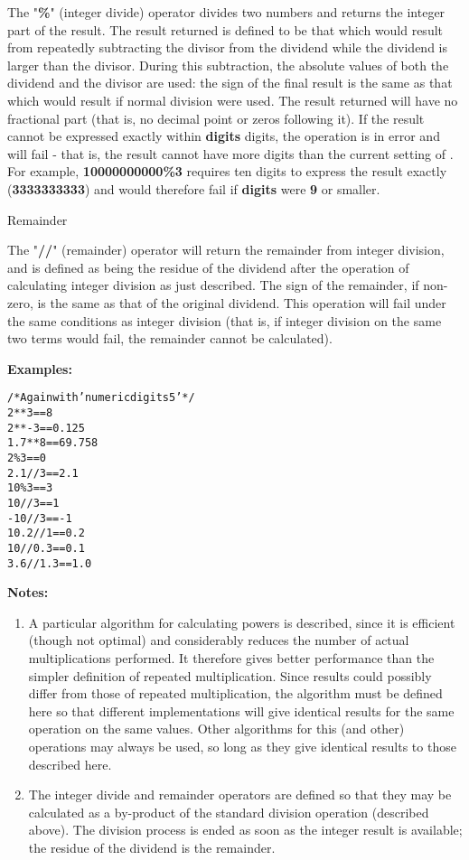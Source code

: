 \begin{description}
\index{,}
The "\textbf{\%}" (integer divide) operator divides two numbers
and returns the integer part of the result.
The result returned is defined to be that which would result from
repeatedly subtracting the divisor from the dividend while the dividend
is larger than the divisor.  During this subtraction, the absolute
values of both the dividend and the divisor are used: the sign of the
final result is the same as that which would result if normal division
were used.
 The result returned will have no fractional part (that is, no
decimal point or zeros following it).
If the result cannot be expressed exactly within \textbf{digits}
digits, the operation is in error and will fail - that is, the
result cannot have more digits than the current setting of .
For example, \textbf{10000000000\%3} requires ten digits to express the
result exactly (\textbf{3333333333}) and would therefore fail
if \textbf{digits} were \textbf{9} or smaller.
\item{Remainder}

\index{,}
\index{,}
\index{,}
The "\textbf{//}" (remainder) operator will return the remainder
from integer division, and is defined
as being the residue of the dividend after the operation of calculating
integer division as just described.
The sign of the remainder, if non-zero, is the same as that of the
original dividend.
 This operation will fail under the same conditions as integer
division (that is, if integer division on the same two terms would
fail, the remainder cannot be calculated).
\end{description}
 \textbf{Examples:}
\begin{alltt}
/* Again with 'numeric digits 5' */
2**3        ==  8
2**-3       ==  0.125
1.7**8      ==  69.758
2\%3         ==  0
2.1//3      ==  2.1
10\%3        ==  3
10//3       ==  1
-10//3      ==  -1
10.2//1     ==  0.2
10//0.3     ==  0.1
3.6//1.3    ==  1.0
\end{alltt}
 \textbf{Notes:}
\begin{enumerate}
\item A particular algorithm for calculating powers is described, since
it is efficient (though not optimal) and considerably reduces the
number of actual multiplications performed.
It therefore gives better performance than the simpler definition of
repeated multiplication.
Since results could possibly differ from those of repeated
multiplication, the algorithm must be defined here so that different
implementations will give identical results for the same operation on
the same values.
Other algorithms for this (and other) operations may always be used, so
long as they give identical results to those described here.
\item The integer divide and remainder operators are defined so that they
may be calculated as a by-product of the standard division operation
(described above).  The division process is ended as soon as the
integer result is available; the residue of the dividend is the
remainder.
\end{enumerate}
